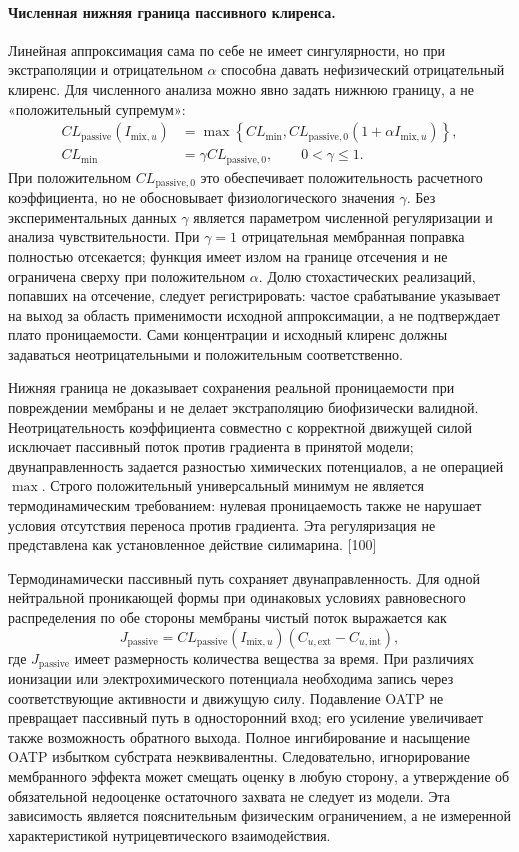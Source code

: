\documentclass[11pt]{article}
\begin{document}
\paragraph{Численная нижняя граница пассивного клиренса.}
Линейная аппроксимация сама по себе не имеет сингулярности, но при экстраполяции и отрицательном \(\alpha\) способна давать нефизический отрицательный клиренс. Для численного анализа можно явно задать нижнюю границу, а не «положительный супремум»:
\[
\begin{aligned}
CL_{\mathrm{passive}}(I_{\mathrm{mix},u})
&=\max\!\left\{CL_{\min},
CL_{\mathrm{passive},0}(1+\alpha I_{\mathrm{mix},u})\right\},\\
CL_{\min}&=\gamma CL_{\mathrm{passive},0},
\qquad 0<\gamma\leq1.
\end{aligned}
\]
При положительном \(CL_{\mathrm{passive},0}\) это обеспечивает положительность расчетного коэффициента, но не обосновывает физиологического значения \(\gamma\). Без экспериментальных данных \(\gamma\) является параметром численной регуляризации и анализа чувствительности. При \(\gamma=1\) отрицательная мембранная поправка полностью отсекается; функция имеет излом на границе отсечения и не ограничена сверху при положительном \(\alpha\). Долю стохастических реализаций, попавших на отсечение, следует регистрировать: частое срабатывание указывает на выход за область применимости исходной аппроксимации, а не подтверждает плато проницаемости. Сами концентрации и исходный клиренс должны задаваться неотрицательными и положительным соответственно.

Нижняя граница не доказывает сохранения реальной проницаемости при повреждении мембраны и не делает экстраполяцию биофизически валидной. Неотрицательность коэффициента совместно с корректной движущей силой исключает пассивный поток против градиента в принятой модели; двунаправленность задается разностью химических потенциалов, а не операцией \(\max\). Строго положительный универсальный минимум не является термодинамическим требованием: нулевая проницаемость также не нарушает условия отсутствия переноса против градиента. Эта регуляризация не представлена как установленное действие силимарина. [100]

Термодинамически пассивный путь сохраняет двунаправленность. Для одной нейтральной проникающей формы при одинаковых условиях равновесного распределения по обе стороны мембраны чистый поток выражается как
\[
J_{\mathrm{passive}}=
CL_{\mathrm{passive}}(I_{\mathrm{mix},u})
\left(C_{u,\mathrm{ext}}-C_{u,\mathrm{int}}\right),
\]
где \(J_{\mathrm{passive}}\) имеет размерность количества вещества за время. При различиях ионизации или электрохимического потенциала необходима запись через соответствующие активности и движущую силу. Подавление OATP не превращает пассивный путь в односторонний вход; его усиление увеличивает также возможность обратного выхода. Полное ингибирование и насыщение OATP избытком субстрата неэквивалентны. Следовательно, игнорирование мембранного эффекта может смещать оценку в любую сторону, а утверждение об обязательной недооценке остаточного захвата не следует из модели. Эта зависимость является пояснительным физическим ограничением, а не измеренной характеристикой нутрицевтического взаимодействия.
\end{document}
